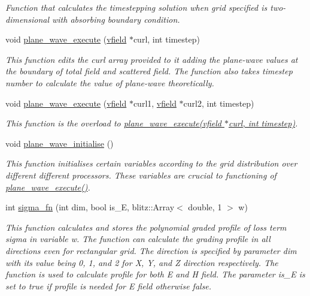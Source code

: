 \begin{DoxyCompactItemize}
\begin{DoxyCompactList}\small\item\em Function that calculates the timestepping solution when grid specified is two-\/dimensional with absorbing boundary condition. \end{DoxyCompactList}\item 
void \hyperlink{classmaxwell_a9c092b4548653a12392086ad9d1aacd9}{plane\+\_\+wave\+\_\+execute} (\hyperlink{classvfield}{vfield} $\ast$curl, int timestep)
\begin{DoxyCompactList}\small\item\em This function edits the curl array provided to it adding the plane-\/wave values at the boundary of total field and scattered field. The function also takes timestep number to calculate the value of plane-\/wave theoretically. \end{DoxyCompactList}\item 
void \hyperlink{classmaxwell_accc6c945840c950b18a0f380dcaccec8}{plane\+\_\+wave\+\_\+execute} (\hyperlink{classvfield}{vfield} $\ast$curl1, \hyperlink{classvfield}{vfield} $\ast$curl2, int timestep)
\begin{DoxyCompactList}\small\item\em This function is the overload to \hyperlink{classmaxwell_a9c092b4548653a12392086ad9d1aacd9}{plane\+\_\+wave\+\_\+execute(vfield $\ast$curl, int timestep)}. \end{DoxyCompactList}\item 
void \hyperlink{classmaxwell_af829951651b4e98af5dcb891898415da}{plane\+\_\+wave\+\_\+initialise} ()
\begin{DoxyCompactList}\small\item\em This function initialises certain variables according to the grid distribution over different different processors. These variables are crucial to functioning of \hyperlink{classmaxwell_a9c092b4548653a12392086ad9d1aacd9}{plane\+\_\+wave\+\_\+execute()}. \end{DoxyCompactList}\item 
int \hyperlink{classmaxwell_af806ab1486ebc79103b41171d46d759b}{sigma\+\_\+fn} (int dim, bool is\+\_\+E, blitz\+::\+Array$<$ double, 1 $>$ w)
\begin{DoxyCompactList}\small\item\em This function calculates and stores the polynomial graded profile of loss term sigma in variable \textquotesingle{}w\textquotesingle{}. The function can calculate the grading profile in all directions even for rectangular grid. The direction is specified by parameter \textquotesingle{}dim\textquotesingle{} with its value being 0, 1, and 2 for X, Y, and Z direction respectively. The function is used to calculate profile for both E and H field. The parameter \textquotesingle{}is\+\_\+E\textquotesingle{} is set to true if profile is needed for E field otherwise false. \end{DoxyCompactList}\item 

\end{DoxyCompactItemize}
